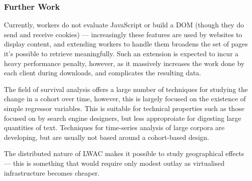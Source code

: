 \subsubsection{Further Work}
Currently, workers do not evaluate JavaScript or build a DOM (though they do send and receive cookies) --- increasingly these features are used by websites to display content, and extending workers to handle them broadens the set of pages it's possible to retrieve meaningfully.  Such an extension is expected to incur a heavy performance penalty, however, as it massively increases the work done by each client during downloads, and complicates the resulting data.

The field of survival analysis offers a large number of techniques for studying the change in a cohort over time, however, this is largely focused on the existence of simple regressor variables.  This is suitable for technical properties such as those focused on by search engine designers, but less approproiate for digesting large quantities of text.  Techniques for time-series analysis of large corpora are developing, but are usually not based around a cohort-based design.

The distributed nature of LWAC makes it possible to study geographical effects --- this is something that would require only modest outlay as virtualised infrastructure becomes cheaper.




